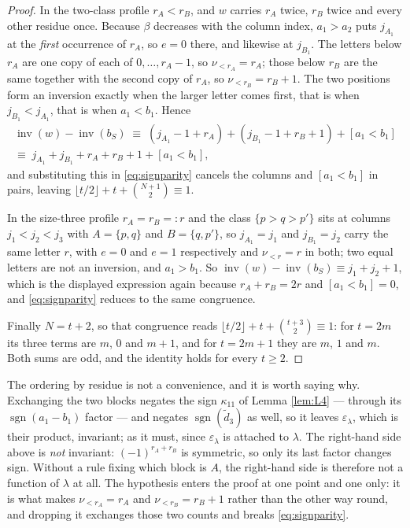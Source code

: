 \documentclass[11pt,reqno]{amsart}
\theoremstyle{plain}
\theoremstyle{definition}
\newcommand{\inv}{\operatorname{inv}}
\newcommand{\sgn}{\operatorname{sgn}}
\begin{document}
\begin{proof}
In the two-class profile $r_A<r_B$, and $w$ carries $r_A$ twice, $r_B$ twice and every other residue
once. Because $\beta$ decreases with the column index, $a_1>a_2$ puts $j_{A_1}$ at the \emph{first}
occurrence of $r_A$, so $e=0$ there, and likewise at $j_{B_1}$. The letters below $r_A$ are one copy
of each of $0,\dots,r_A-1$, so $\nu_{<r_A}=r_A$; those below $r_B$ are the same together with the
second copy of $r_A$, so $\nu_{<r_B}=r_B+1$. The two positions form an inversion exactly when the
larger letter comes first, that is when $j_{B_1}<j_{A_1}$, that is when $a_1<b_1$. Hence
\begin{multline*}
\inv(w)-\inv(b_S)\;\equiv\;(j_{A_1}-1+r_A)+(j_{B_1}-1+r_B+1)+[a_1<b_1]\\
\equiv\;j_{A_1}+j_{B_1}+r_A+r_B+1+[a_1<b_1],
\end{multline*}
and substituting this in \eqref{eq:signparity} cancels the columns and $[a_1<b_1]$ in pairs, leaving
$\lfloor t/2\rfloor+t+\binom{N+1}{2}\equiv1$.

In the size-three profile $r_A=r_B=:r$ and the class $\{p>q>p'\}$ sits at columns $j_1<j_2<j_3$ with
$A=\{p,q\}$ and $B=\{q,p'\}$, so $j_{A_1}=j_1$ and $j_{B_1}=j_2$ carry the same letter $r$, with
$e=0$ and $e=1$ respectively and $\nu_{<r}=r$ in both; two equal letters are not an inversion, and
$a_1>b_1$. So $\inv(w)-\inv(b_S)\equiv j_1+j_2+1$, which is the displayed expression again because
$r_A+r_B=2r$ and $[a_1<b_1]=0$, and \eqref{eq:signparity} reduces to the same congruence.

Finally $N=t+2$, so that congruence reads $\lfloor t/2\rfloor+t+\binom{t+3}{2}\equiv1$: for $t=2m$
its three terms are $m$, $0$ and $m+1$, and for $t=2m+1$ they are $m$, $1$ and $m$. Both sums are
odd, and the identity holds for every $t\ge2$.
\end{proof}

The ordering by residue is not a convenience, and it is worth saying why. Exchanging the two blocks
negates the sign $\kappa_{11}$ of Lemma \ref{lem:L4} --- through its $\sgn(a_1-b_1)$ factor --- and negates
$\sgn(\tilde d_3)$ as well, so it leaves $\varepsilon_\lambda$, which is their product,
invariant; as it must, since $\varepsilon_\lambda$ is attached to $\lambda$. The right-hand side
above is \emph{not} invariant: $(-1)^{r_A+r_B}$ is symmetric, so only its last factor changes sign.
Without a rule fixing which block is $A$, the right-hand side is therefore not a function of
$\lambda$ at all. The hypothesis enters the proof at one point and one only: it is what makes
$\nu_{<r_A}=r_A$ and $\nu_{<r_B}=r_B+1$ rather than the other way round, and dropping it exchanges
those two counts and breaks \eqref{eq:signparity}.
\end{document}
